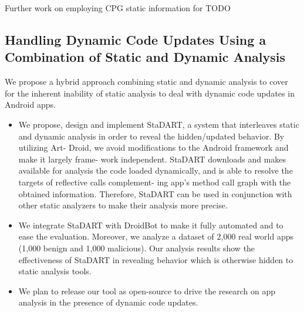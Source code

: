 Further work on employing CPG static information for TODO

\subsection{Handling Dynamic Code Updates Using a Combination of Static and Dynamic Analysis}

We propose a hybrid approach combining static and dynamic analysis to cover for the inherent inability of static analysis to deal with dynamic code updates in Android apps.
\begin{itemize}
\item We propose, design and implement StaDART, a system that interleaves static and dynamic analysis in order to reveal the hidden/updated behavior. By utilizing Art- Droid, we avoid modifications to the Android framework and make it largely frame- work independent. StaDART downloads and makes available for analysis the code loaded dynamically, and is able to resolve the targets of reflective calls complement- ing app’s method call graph with the obtained information. Therefore, StaDART can be used in conjunction with other static analyzers to make their analysis more precise.
\item We integrate StaDART with DroidBot to make it fully automated and to ease the evaluation. Moreover, we analyze a dataset of 2,000 real world apps (1,000 benign and 1,000 malicious). Our analysis results show the effectiveness of StaDART in revealing behavior which is otherwise hidden to static analysis tools.
\item We plan to release our tool as open-source to drive the research on app analysis in the presence of dynamic code updates.
\end{itemize}


